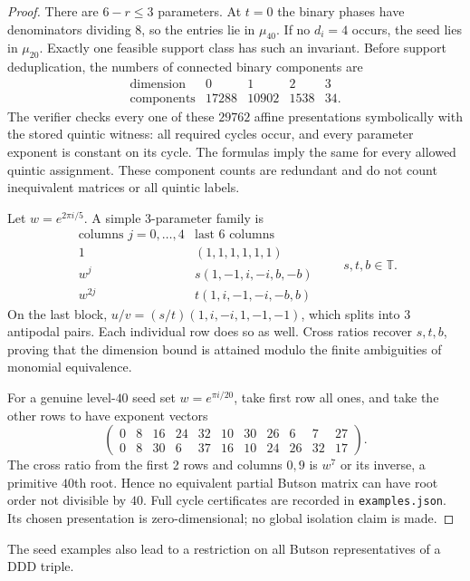 \documentclass[11pt,a4paper]{article}
\theoremstyle{plain}
\theoremstyle{definition}
\theoremstyle{plain}
\begin{document}
\begin{proof}
There are $6-r\le3$ parameters. At $t=0$ the binary phases have denominators dividing $8$, so the entries lie in $\mu_{40}$. If no $d_i=4$ occurs, the seed lies in $\mu_{20}$. Exactly one feasible support class has such an invariant. Before support deduplication, the numbers of connected binary components are
$$\begin{array}{c|rrrr}
\text{dimension}&0&1&2&3\\\hline
\text{components}&17288&10902&1538&34.
\end{array}$$
The verifier checks every one of these $29762$ affine presentations symbolically with the stored quintic witness: all required cycles occur, and every parameter exponent is constant on its cycle. The formulas imply the same for every allowed quintic assignment. These component counts are redundant and do not count inequivalent matrices or all quintic labels.

\medskip
Let $w=e^{2\pi i/5}$. A simple 3-parameter family is
$$\begin{array}{c|c}
\text{columns }j=0,\ldots,4&\text{last 6 columns}\\\hline
1&(1,1,1,1,1,1)\\
w^{j}&s(1,-1,i,-i,b,-b)\\
w^{2j}&t(1,i,-1,-i,-b,b)
\end{array}
\qquad s,t,b\in\mathbb{T}.$$
On the last block, $u/v=(s/t)(1,i,-i,1,-1,-1)$, which splits into 3 antipodal pairs. Each individual row does so as well. Cross ratios recover $s,t,b$, proving that the dimension bound is attained modulo the finite ambiguities of monomial equivalence.

For a genuine level-$40$ seed set $w=e^{\pi i/20}$, take first row all ones, and take the other rows to have exponent vectors
$$\begin{pmatrix}
0&8&16&24&32&10&30&26&6&7&27\\
0&8&30&6&37&16&10&24&26&32&17
\end{pmatrix}.$$
The cross ratio from the first 2 rows and columns $0,9$ is $w^{7}$ or its inverse, a primitive $40$th root. Hence no equivalent partial Butson matrix can have root order not divisible by $40$. Full cycle certificates are recorded in \texttt{examples.json}. Its chosen presentation is zero-dimensional; no global isolation claim is made.
\end{proof}

The seed examples also lead to a restriction on all Butson representatives of a $\mathrm{DDD}$ triple.
\end{document}
